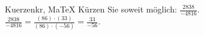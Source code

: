 \begin{MAufgabe}{Kuerzen}{kr, MaTeX}
K\"urzen Sie soweit m\"oglich: $\frac{2838}{-4816}$.\\ 
\ifLsg\MLoesung
\quad $\frac{2838}{-4816}=\frac{(86)\cdot(33)}{(86)\cdot(-56)}=\frac{33}{-56}$.\else\relax\fi
 \end{MAufgabe}